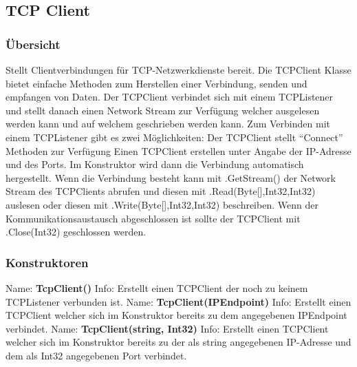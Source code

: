 \subsection{TCP Client} \label{tcpclient}
\subsubsection{Übersicht}
Stellt Clientverbindungen für TCP-Netzwerkdienste bereit. Die TCPClient Klasse bietet einfache Methoden zum Herstellen einer Verbindung, senden und empfangen von Daten. Der TCPClient verbindet sich mit einem TCPListener und stellt danach einen Network Stream zur Verfügung welcher ausgelesen werden kann und auf welchem geschrieben werden kann. Zum Verbinden mit einem TCPListener gibt es zwei Möglichkeiten:
Der TCPClient stellt “Connect” Methoden zur Verfügung
Einen TCPClient erstellen unter Angabe der IP-Adresse und des Ports. Im Konstruktor wird dann die Verbindung automatisch hergestellt.
Wenn die Verbindung besteht kann mit .GetStream() der Network Stream des TCPClients abrufen und diesen mit .Read(Byte[],Int32,Int32) auslesen oder diesen mit .Write(Byte[],Int32,Int32) beschreiben. Wenn der Kommunikationsaustausch abgeschlossen ist sollte der TCPClient mit .Close(Int32) geschlossen werden.
\subsubsection{Konstruktoren}
Name: \textbf{TcpClient()}
\newline
Info: Erstellt einen TCPClient der noch zu keinem TCPListener verbunden ist.
\newline
\newline
Name: \textbf{TcpClient(IPEndpoint)}
\newline
Info: Erstellt einen TCPClient welcher sich im Konstruktor bereits zu dem angegebenen IPEndpoint verbindet.
\newline
\newline
Name: \textbf{TcpClient(string, Int32)}
\newline
Info: Erstellt einen TCPClient welcher sich im Konstruktor bereits zu der als string angegebenen IP-Adresse und dem als Int32 angegebenen Port verbindet.
